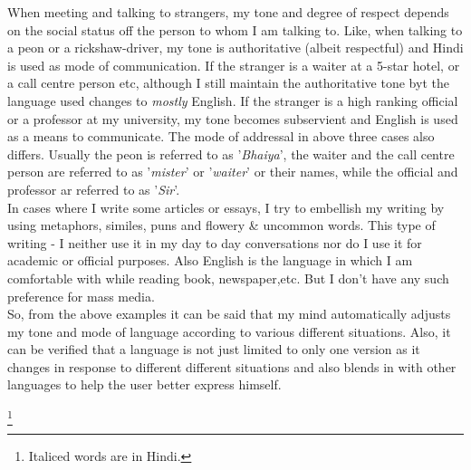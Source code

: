 \documentclass[12pt,a4paper]{article}
\newcommand\blfootnote[1]{%
  \begingroup
  \renewcommand\thefootnote{}\footnote{#1}%
  \addtocounter{footnote}{-1}%
  \endgroup
}
\begin{document}
When meeting and talking to strangers, my tone and degree of respect depends on the social status off the person to whom I am talking to. Like, when talking to a peon or a rickshaw-driver, my tone is authoritative (albeit respectful) and Hindi is used as mode of communication. If the stranger is a waiter at a 5-star hotel, or a call centre person etc, although I still maintain the authoritative tone byt the language used changes to \textit{mostly} English. If the stranger is a high ranking official or a professor at my university, my tone becomes subservient and English is used as a means to communicate. The mode of addressal in above three cases also differs. Usually the peon is referred to as '\textit{Bhaiya}', the waiter and the call centre person are referred to as '\textit{mister}' or '\textit{waiter}' or their names, while the official and professor ar referred to as '\textit{Sir}'.
\\

In cases where I write some articles or essays, I try to embellish my writing by using metaphors, similes, puns and flowery \& uncommon words. This type of writing - I neither use it in my day to day conversations nor do I use it for academic or official purposes. Also English is the language in which I am comfortable with while reading book, newspaper,etc. But I don't have any such preference for mass media.
\\

So, from the above examples it can be said that my mind automatically adjusts my tone and mode of language according to various different situations. Also, it can be verified that a language is not just limited to only one version as it changes in response to different different situations and also blends in with other languages to help the user better express himself. 

\blfootnote{Italiced words are in Hindi.}
\end{document}

